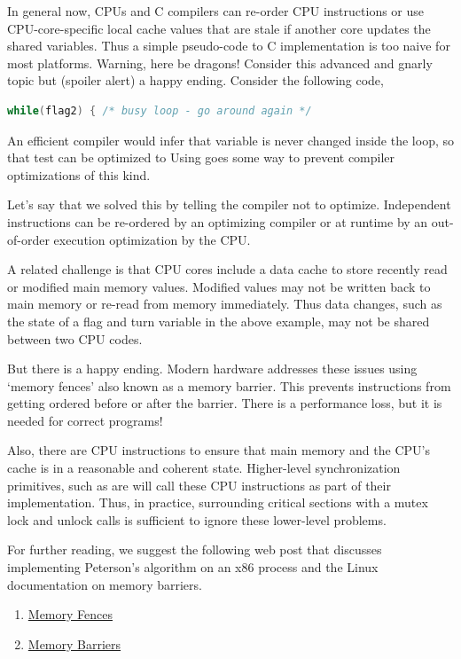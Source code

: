In general now, CPUs and C compilers can re-order CPU instructions or use CPU-core-specific local cache values that are stale if another core updates the shared variables.
Thus a simple pseudo-code to C implementation is too naive for most platforms.
Warning, here be dragons!
Consider this advanced and gnarly topic but (spoiler alert) a happy ending.
Consider the following code,

\begin{lstlisting}[language=C]
while(flag2) { /* busy loop - go around again */
\end{lstlisting}

An efficient compiler would infer that  variable is never changed inside the loop, so that test can be optimized to  Using  goes some way to prevent compiler optimizations of this kind.

Let's say that we solved this by telling the compiler not to optimize.
Independent instructions can be re-ordered by an optimizing compiler or at runtime by an out-of-order execution optimization by the CPU.

A related challenge is that CPU cores include a data cache to store recently read or modified main memory values.
Modified values may not be written back to main memory or re-read from memory immediately.
Thus data changes, such as the state of a flag and turn variable in the above example, may not be shared between two CPU codes.

But there is a happy ending.
Modern hardware addresses these issues using `memory fences' also known as a memory barrier.
This prevents instructions from getting ordered before or after the barrier.
There is a performance loss, but it is needed for correct programs!

Also, there are CPU instructions to ensure that main memory and the CPU's cache is in a reasonable and coherent state.
Higher-level synchronization primitives, such as  are will call these CPU instructions as part of their implementation.
Thus, in practice, surrounding critical sections with a mutex lock and unlock calls is sufficient to ignore these lower-level problems.

For further reading, we suggest the following web post that discusses implementing Peterson's algorithm on an x86 process and the Linux documentation on memory barriers.
\begin{enumerate}
\item \href{http://bartoszmilewski.com/2008/11/05/who-ordered-memory-fences-on-an-x86/}{Memory Fences}
\item \href{http://lxr.free-electrons.com/source/Documentation/memory-barriers.txt}{Memory Barriers}
\end{enumerate}


